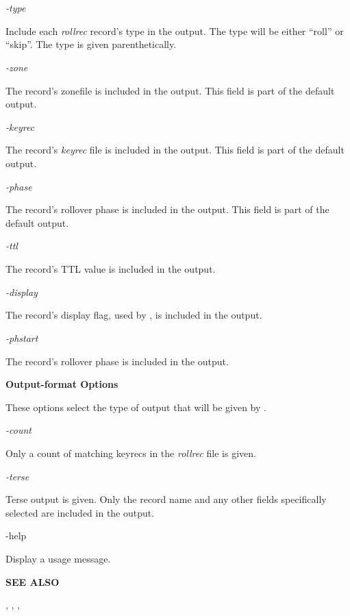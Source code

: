 \begin{description}

\item {\it -type}\verb" "

Include each {\it rollrec} record's type in the output.  The type will be
either ``roll'' or ``skip''.  The type is given parenthetically.

\item {\it -zone}\verb" "

The record's zonefile is included in the output.  This field is part
of the default output.

\item {\it -keyrec}\verb" "

The record's {\it keyrec} file is included in the output.  This field is part
of the default output.

\item {\it -phase}\verb" "

The record's rollover phase is included in the output.  This field is part of
the default output.

\item {\it -ttl}\verb" "

The record's TTL value is included in the output.

\item {\it -display}\verb" "

The record's display flag, used by , is included in the
output.

\item {\it -phstart}\verb" "

The record's rollover phase is included in the output.

\end{description}

{\bf Output-format Options}

These options select the type of output that will be given by .

\begin{description}

\item {\it -count}\verb" "

Only a count of matching keyrecs in the {\it rollrec} file is given.

\item {\it -terse}\verb" "

Terse output is given.  Only the record name and any other fields specifically
selected are included in the output.

\item -help\verb" "

Display a usage message.

\end{description}

{\bf SEE ALSO}

,
,
,


